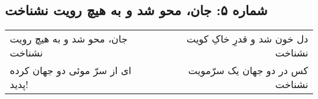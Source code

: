 \begin{center}
\section*{شماره ۵: جان، محو شد و به هیچ رویت نشناخت}
\label{sec:005}
\begin{longtable}{l p{0.5cm} r}
جان، محو شد و به هیچ رویت نشناخت
&&
دل خون شد و قدرِ خاکِ کویت نشناخت
\\
ای از سرّ موئی دو جهان کرده پدید!
&&
کس در دو جهان یک سرّ‌مویت نشناخت
\\
\end{longtable}
\end{center}
